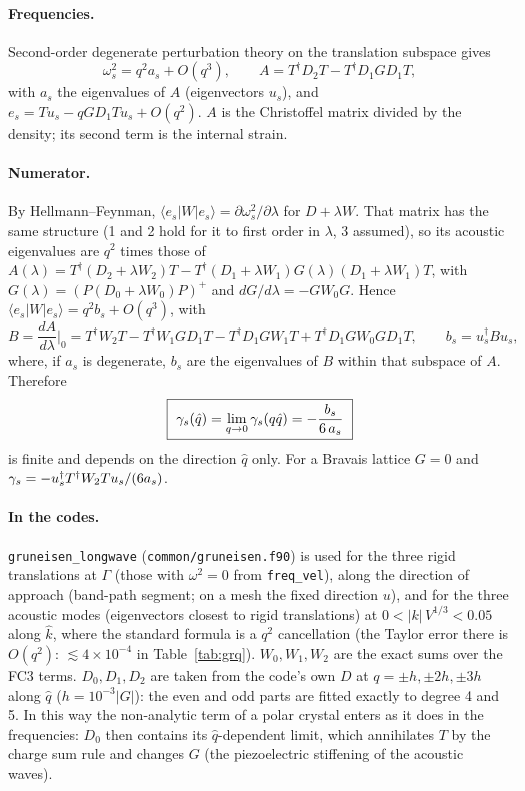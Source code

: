 \documentclass[11pt,a4paper]{article}
\newcommand{\la}{\lambda}\newcommand{\ep}{\varepsilon}\newcommand{\si}{\sigma}\newcommand{\Ga}{\Gamma}
\begin{document}
\paragraph{Frequencies.} Second-order degenerate perturbation theory on the translation subspace gives
\begin{equation}
\omega_s^2=q^2a_s+O(q^3),\qquad A=T^\dagger D_2T-T^\dagger D_1GD_1T,
\label{eq:Achr}
\end{equation}
with $a_s$ the eigenvalues of $A$ (eigenvectors $u_s$), and $e_s=Tu_s-qGD_1Tu_s+O(q^2)$. $A$ is the
Christoffel matrix divided by the density; its second term is the internal strain.
\paragraph{Numerator.} By Hellmann--Feynman, $\langle e_s|W|e_s\rangle=\partial\omega_s^2/\partial\la$ for
$D+\la W$. That matrix has the same structure (1 and 2 hold for it to first order in $\la$, 3 assumed), so its
acoustic eigenvalues are $q^2$ times those of
$A(\la)=T^\dagger(D_2+\la W_2)T-T^\dagger(D_1+\la W_1)G(\la)(D_1+\la W_1)T$, with
$G(\la)=(P(D_0+\la W_0)P)^+$ and $dG/d\la=-GW_0G$. Hence $\langle e_s|W|e_s\rangle=q^2b_s+O(q^3)$, with
\begin{equation}
B=\frac{dA}{d\la}\Big|_0=T^\dagger W_2T-T^\dagger W_1GD_1T-T^\dagger D_1GW_1T+T^\dagger D_1GW_0GD_1T,
\qquad b_s=u_s^\dagger Bu_s ,
\label{eq:Bchr}
\end{equation}
where, if $a_s$ is degenerate, $b_s$ are the eigenvalues of $B$ within that subspace of $A$. Therefore
\begin{equation}
\boxed{\ \gamma_s(\hat q)=\lim_{q\to0}\gamma_s(q\hat q)=-\frac{b_s}{6\,a_s}\ }
\label{eq:gq0}
\end{equation}
is finite and depends on the direction $\hat q$ only. For a Bravais lattice $G=0$ and
$\gamma_s=-u_s^\dagger T^\dagger W_2Tu_s/(6a_s)$.

\paragraph{In the codes.} \texttt{gruneisen\_longwave} (\texttt{common/gruneisen.f90}) is used for the three
rigid translations at $\Ga$ (those with $\omega^2=0$ from \texttt{freq\_vel}), along the direction of approach
(band-path segment; on a mesh the fixed direction $u$), and for the three acoustic modes (eigenvectors
closest to rigid translations) at $0<|k|\,V^{1/3}<0.05$ along $\hat k$, where the standard formula is a
$q^2$ cancellation (the Taylor error there is $O(q^2)$: $\lesssim4\times10^{-4}$ in Table~\ref{tab:grq}). $W_0,W_1,W_2$ are the exact sums over the FC3 terms.
$D_0,D_1,D_2$ are taken from the code's own $D$ at $q=\pm h,\pm2h,\pm3h$ along $\hat q$
($h=10^{-3}|G|$): the even and odd parts are fitted exactly to degree 4 and 5. In this way the non-analytic
term of a polar crystal enters as it does in the frequencies: $D_0$ then contains its $\hat q$-dependent limit,
which annihilates $T$ by the charge sum rule and changes $G$ (the piezoelectric stiffening of the acoustic
waves).
\end{document}

